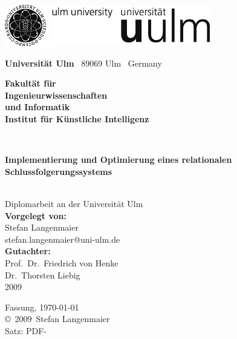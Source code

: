 \documentclass[a4paper,10pt,bibtotoc,twoside,openright,pointlessnumbers,normalheadings,DIV=9
]{scrbook}
\makeatletter
\newcommand{\fullname}{Stefan Langenmaier}
\newcommand{\email}{stefan.langenmaier@uni-ulm.de}
\newcommand{\titel}{Implementierung und Optimierung eines relationalen Schlussfolgerungssystems}
\newcommand{\jahr}{2009}
\newcommand{\gutachterA}{Prof.~Dr.~Friedrich von Henke}
\newcommand{\gutachterB}{Dr.~Thorsten Liebig}
\newcommand{\betreuer}{Dr.~Thorsten Liebig}
\newcommand{\fakultaet}{Ingenieurwissenschaften\\und Informatik}
\newcommand{\institut}{Institut für Künstliche Intelligenz}
\makeatother
\begin{document}
\frontmatter

\thispagestyle{empty}
\begin{addmargin*}[4mm]{-32mm}

\includegraphics[height=1.8cm]{images/unilogo_bild}
\hfill
\includegraphics[height=1.8cm]{images/unilogo_wort}\\[1em]

{\footnotesize
{\bfseries Universität Ulm} \textbar ~89069 Ulm \textbar ~Germany
\hspace*{60mm}\parbox[t]{48mm}{\bfseries Fakultät für\\
\fakultaet\\
\mdseries \institut}\\[2cm]

\parbox{140mm}{\bfseries \huge \titel}\\[0.5em]
{\footnotesize Diplomarbeit an der Universität Ulm}\\[3em]

{\footnotesize \bfseries Vorgelegt von:}\\
{\footnotesize \fullname\\\email}\\[2em]
{\footnotesize \bfseries Gutachter:}\\                     
{\footnotesize\gutachterA\\
\gutachterB}\\[2em]
{\footnotesize\jahr}
}
\end{addmargin*}


\clearpage
\thispagestyle{empty}
{ \small
  \flushleft
  Fassung, \today \\\vfill
  \copyright~\jahr~\fullname\\[0.5em]

  Satz: PDF-\LaTeXe
}
\end{document}
